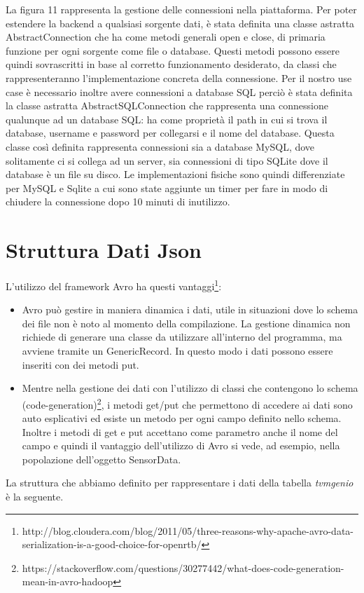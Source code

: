 La figura 11 rappresenta la gestione delle connessioni nella piattaforma. Per poter estendere la backend a qualsiasi sorgente dati, è stata definita una classe astratta AbstractConnection che ha come metodi generali open e close, di primaria funzione per ogni sorgente come file o database. Questi metodi possono essere quindi sovrascritti in base al corretto funzionamento desiderato, da classi che rappresenteranno l’implementazione concreta della connessione. Per il nostro use case è necessario inoltre avere connessioni a database SQL perciò è stata definita la classe astratta AbstractSQLConnection che rappresenta una connessione qualunque ad un database SQL: ha come proprietà il path in cui si trova il database,  username e password per collegarsi e il nome del database. Questa classe così definita rappresenta connessioni sia a database MySQL, dove solitamente ci si collega ad un server, sia connessioni di tipo SQLite dove il database è un file su disco. Le implementazioni fisiche sono quindi differenziate per MySQL e Sqlite a cui sono state aggiunte un timer per fare in modo di chiudere la connessione dopo 10 minuti di inutilizzo.
\clearpage
\section{Struttura Dati Json}
L’utilizzo del framework Avro ha questi vantaggi\footnote{http://blog.cloudera.com/blog/2011/05/three-reasons-why-apache-avro-data-serialization-is-a-good-choice-for-openrtb/}:
\begin{itemize}
	\item Avro può gestire in maniera dinamica i dati, utile in situazioni dove lo schema dei file non è noto al momento della compilazione. La gestione dinamica non richiede di generare una classe da utilizzare all’interno del programma, ma avviene tramite un GenericRecord. In questo modo i dati possono essere inseriti con dei metodi put.
	\item Mentre nella gestione dei dati con l’utilizzo di classi che contengono lo schema (code-generation)\footnote{https://stackoverflow.com/questions/30277442/what-does-code-generation-mean-in-avro-hadoop}, i metodi get/put che permettono di accedere ai dati sono auto esplicativi ed esiste un metodo per ogni campo definito nello schema. Inoltre i metodi di get e put accettano come parametro anche il nome del campo e quindi il vantaggio dell’utilizzo di Avro si vede, ad esempio, nella popolazione dell’oggetto SensorData. 	
\end{itemize}
La struttura che abbiamo definito per rappresentare i dati della tabella \textit{tvmgenio} è la seguente.
{\selectfont

}

